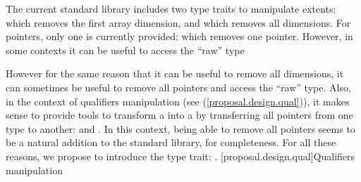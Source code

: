 \documentclass[ebook,10pt,oneside,openany,final]{memoir}
\begin{document}
The current standard library includes two type traits to manipulate extents:  which removes the first array dimension, and  which removes all dimensions. For pointers, only one is currently provided:  which removes one pointer. However, in some contexts it can be useful to access the ``raw'' type

However for the same reason that it can be useful to remove all dimensions, it can sometimes be useful to remove all pointers and access the ``raw'' type. Also, in the context of qualifiers manipulation (see (\ref{proposal.design.qual})), it makes sense to provide tools to transform a  into a  by transferring all pointers from one type to another:  and . In this context, being able to remove all pointers seems to be a natural addition to the standard library, for completeness. For all these reasons, we propose to introduce the type trait: .
[proposal.design.qual]{Qualifiers manipulation}
\end{document}
